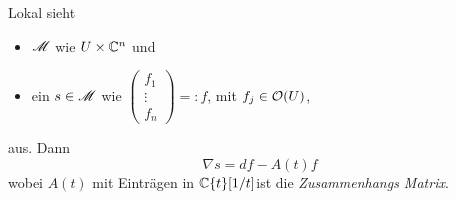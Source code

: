 \begin{rem}
  Lokal sieht
  \begin{itemize}
    \item $\mathscr{M}$ wie $U\times\mathbb{C}^n$ und
    \item ein $s\in\mathscr{M}$ wie
      $\begin{pmatrix}f_{1}\\ \vdots\\ f_{n} \end{pmatrix}=:f$,
      mit $f_j\in\mathcal{O}(U)$,
  \end{itemize}
  aus.
  Dann
  \[
    \nabla s=df - A(t)f
  \]
  wobei $A(t)$ mit Einträgen in
  $\mathbb{C}\{t\}[1/t]$ ist die
  \emph{Zusammenhangs Matrix}.

  \begin{comment}
    Wollen diese Klassifizieren. Klassifiziere diese durch die Lösung von
    $\nabla s=0$. Dies ist eine DGL (ODE).
  \end{comment}
\end{rem}
\begin{comment}
  \subsection{Irregularität von meromorphen Zusammenhängen} %
  \TODO[\cite{sabbah2007isomonodromic}: p. 86]
  \TODO[\cite{sabbah2007isomonodromic}: Def II.2.24]
\end{comment}
